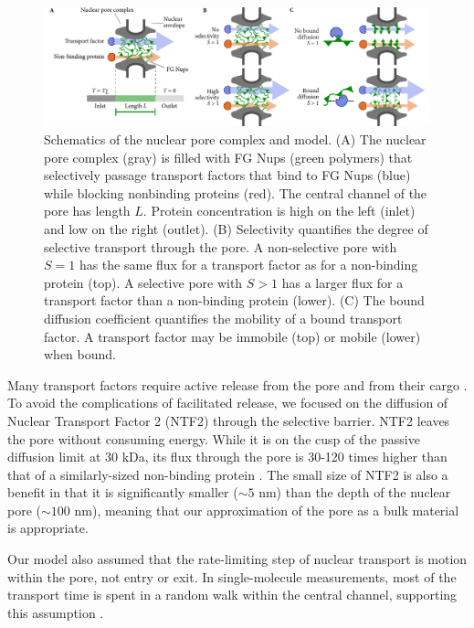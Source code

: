 \begin{figure}[t!]
\centering
\includegraphics[width=17.8cm]{figs/ch02/fig1.pdf}
\caption[Schematics of the nuclear pore complex and model.]{Schematics of the nuclear pore complex and model. (A) The
  nuclear pore complex (gray) is filled with FG Nups (green polymers)
  that selectively passage transport factors that bind to FG Nups
  (blue) while blocking nonbinding proteins (red). The central
  channel of the pore has length $L$. Protein concentration is high on
  the left (inlet) and low on the right (outlet).  (B) Selectivity
  quantifies the degree of selective transport through the pore. A
  non-selective pore with $S=1$ has the same flux for a transport
  factor as for a non-binding protein (top). A selective pore with
  $S>1$ has a larger flux for a transport factor than a non-binding
  protein (lower). (C) The bound diffusion coefficient quantifies the
  mobility of a bound transport factor.  A transport factor may be
  immobile (top) or mobile (lower) when bound. }
\label{fig:cartoon}
\end{figure}

Many transport factors require active release from the pore and from their cargo \cite{lowe15, mincer11, gorlich96, gilchrist02}.  To avoid the complications of facilitated release, we focused on the diffusion of Nuclear Transport Factor 2 (NTF2) through the selective barrier.  NTF2 leaves the pore without consuming energy.  While it is on the cusp of the passive diffusion limit at 30 kDa, its flux through the pore is 30-120 times higher than that of a similarly-sized non-binding protein \cite{mincer11, zilman07}.  The small size of NTF2 is also a benefit in that it is significantly smaller ($\sim 5$ nm) than the depth of the nuclear pore ($\sim 100$ nm), meaning that our approximation of the pore as a bulk material is appropriate.

Our model also assumed that the rate-limiting step of nuclear transport is motion within the pore, not entry or exit.  In single-molecule measurements, most of the transport time is spent in a random walk within the central channel, supporting this assumption \cite{yang04, tu13}.

